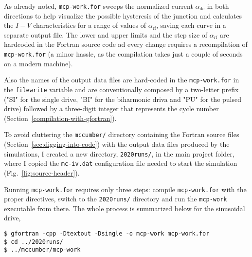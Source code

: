 As already noted, \texttt{mcp-work.for} sweeps the normalized current $\alpha_\mathrm{dc}$ in both directions to help visualize the possible hysteresis of the junction and calculates the $I - V$ characteristics for a range of values of $\alpha_\mathrm{rf}$, saving each curve in a separate output file. 
The lower and upper limits and the step size of $\alpha_\mathrm{rf}$ are hardcoded in the Fortran source code ad every change requires a recompilation of \texttt{mcp-work.for} (a minor hassle, as the compilation takes just a couple of seconds on a modern machine).

Also the names of the output data files are hard-coded in the \texttt{mcp-work.for} in the \texttt{filewrite} variable and are conventionally composed by a two-letter prefix ("SI" for the single drive, "BI" for the biharmonic driva and "PU" for the pulsed drive) followed by a three-digit integer that represents the cycle number (Section~\ref{compilation-with-gfortran}).

To avoid cluttering the \texttt{mccumber/} directory containing the Fortran source files (Section~\ref{sec:digging-into-code}) with the output data files produced by the simulations, I created  a new directory, \texttt{2020runs/}, in the main project folder, where I copied the \texttt{mc-iv.dat} configuration file needed to start the simulation (Fig.~\ref{fig:source-header}).

Running \texttt{mcp-work.for} requires only three steps: compile \texttt{mcp-work.for} with the proper directives, switch to the \texttt{2020runs/} directory and run the \texttt{mcp-work} executable from there. The whole process is summarized below for the sinusoidal drive,

\begin{lstlisting}
$ gfortran -cpp -Dtextout -Dsingle -o mcp-work mcp-work.for
$ cd ../2020runs/
$ ../mccumber/mcp-work
\end{lstlisting}


